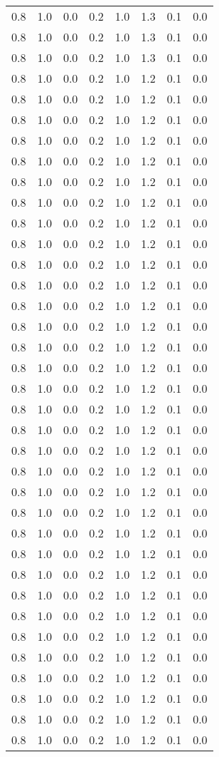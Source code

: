 \begin{tabular}{L{1in}|L{1in}|L{1in}|L{1in}|L{1in}|L{1in}|L{1in}|L{1in}}
0.8&1.0&0.0&0.2&1.0&1.3&0.1&0.0\\
0.8&1.0&0.0&0.2&1.0&1.3&0.1&0.0\\
0.8&1.0&0.0&0.2&1.0&1.3&0.1&0.0\\
0.8&1.0&0.0&0.2&1.0&1.2&0.1&0.0\\
0.8&1.0&0.0&0.2&1.0&1.2&0.1&0.0\\
0.8&1.0&0.0&0.2&1.0&1.2&0.1&0.0\\
0.8&1.0&0.0&0.2&1.0&1.2&0.1&0.0\\
0.8&1.0&0.0&0.2&1.0&1.2&0.1&0.0\\
0.8&1.0&0.0&0.2&1.0&1.2&0.1&0.0\\
0.8&1.0&0.0&0.2&1.0&1.2&0.1&0.0\\
0.8&1.0&0.0&0.2&1.0&1.2&0.1&0.0\\
0.8&1.0&0.0&0.2&1.0&1.2&0.1&0.0\\
0.8&1.0&0.0&0.2&1.0&1.2&0.1&0.0\\
0.8&1.0&0.0&0.2&1.0&1.2&0.1&0.0\\
0.8&1.0&0.0&0.2&1.0&1.2&0.1&0.0\\
0.8&1.0&0.0&0.2&1.0&1.2&0.1&0.0\\
0.8&1.0&0.0&0.2&1.0&1.2&0.1&0.0\\
0.8&1.0&0.0&0.2&1.0&1.2&0.1&0.0\\
0.8&1.0&0.0&0.2&1.0&1.2&0.1&0.0\\
0.8&1.0&0.0&0.2&1.0&1.2&0.1&0.0\\
0.8&1.0&0.0&0.2&1.0&1.2&0.1&0.0\\
0.8&1.0&0.0&0.2&1.0&1.2&0.1&0.0\\
0.8&1.0&0.0&0.2&1.0&1.2&0.1&0.0\\
0.8&1.0&0.0&0.2&1.0&1.2&0.1&0.0\\
0.8&1.0&0.0&0.2&1.0&1.2&0.1&0.0\\
0.8&1.0&0.0&0.2&1.0&1.2&0.1&0.0\\
0.8&1.0&0.0&0.2&1.0&1.2&0.1&0.0\\
0.8&1.0&0.0&0.2&1.0&1.2&0.1&0.0\\
0.8&1.0&0.0&0.2&1.0&1.2&0.1&0.0\\
0.8&1.0&0.0&0.2&1.0&1.2&0.1&0.0\\
0.8&1.0&0.0&0.2&1.0&1.2&0.1&0.0\\
0.8&1.0&0.0&0.2&1.0&1.2&0.1&0.0\\
0.8&1.0&0.0&0.2&1.0&1.2&0.1&0.0\\
0.8&1.0&0.0&0.2&1.0&1.2&0.1&0.0\\
0.8&1.0&0.0&0.2&1.0&1.2&0.1&0.0\\
0.8&1.0&0.0&0.2&1.0&1.2&0.1&0.0\\

\end{tabular}
